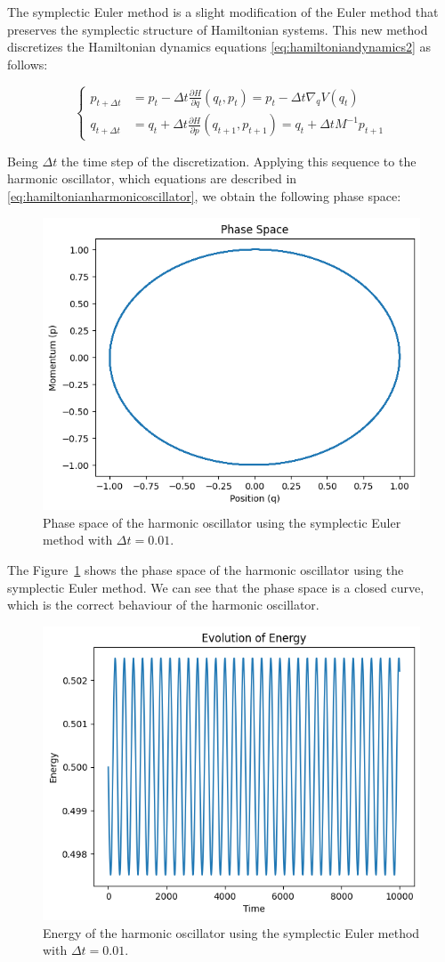 \documentclass{article}
\begin{document}
The symplectic Euler method is a slight modification of the Euler method that preserves the symplectic structure of Hamiltonian systems. This new method discretizes the Hamiltonian dynamics equations \eqref{eq:hamiltoniandynamics2} as follows:

\begin{equation}
	\begin{cases}
		p_{t+ \Delta t} &= p_t - \Delta t \frac{\partial H}{\partial q}(q_t, p_t) = p_t - \Delta t \nabla_q V(q_t) \\
		q_{t+ \Delta t} &= q_t + \Delta t \frac{\partial H}{\partial p}(q_{t+1}, p_{t+1}) = q_t + \Delta t M^{-1} p_{t+1}
	\end{cases}
	\label{eq:symplecticeuler}
\end{equation}

Being \(\Delta t\) the time step of the discretization. Applying this sequence to the harmonic oscillator, which equations are described in \eqref{eq:hamiltonianharmonicoscillator}, we obtain the following phase space:

\begin{figure}[H]
	\centering
	\includegraphics[width=0.5\linewidth]{./Figures/Sympletic/eulerphase.png}
	\caption{Phase space of the harmonic oscillator using the symplectic Euler method with \(\Delta t = 0.01\).}
	\label{fig:eulerphase}
\end{figure}

The Figure~\ref{fig:eulerphase} shows the phase space of the harmonic oscillator using the symplectic Euler method. We can see that the phase space is a closed curve, which is the correct behaviour of the harmonic oscillator.

\begin{figure}[H]
	\centering
	\includegraphics[width=0.5\linewidth]{./Figures/Sympletic/eulerenergy.png}
	\caption{Energy of the harmonic oscillator using the symplectic Euler method with \(\Delta t = 0.01\).}
	\label{fig:eulerenergy}
\end{figure}
\end{document}
